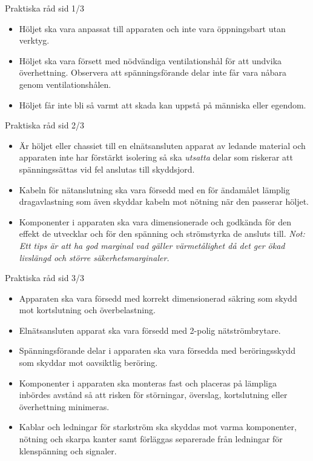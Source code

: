 \documentclass{beamer}
\begin{document}
\begin{frame}{Praktiska råd sid 1/3}
\begin{itemize}
	\item Höljet ska vara anpassat till apparaten och inte vara öppningsbart
	utan verktyg.
	
	\item Höljet ska vara försett med nödvändiga ventilationshål för att
	undvika överhettning.
	Observera att spänningsförande delar inte får vara nåbara genom
	ventilationshålen.
	
	\item Höljet får inte bli så varmt att skada kan uppstå på människa
	eller egendom.
\end{itemize}	
\end{frame}

\begin{frame}{Praktiska råd sid 2/3}
\begin{itemize}
		\item Är höljet eller chassiet till en elnätsansluten apparat av ledande
	material och apparaten inte har förstärkt isolering så ska \emph{utsatta}
	delar som riskerar att spänningssättas vid fel anslutas till skyddsjord.
	
	\item Kabeln för nätanslutning ska vara försedd med en för ändamålet lämplig
	dragavlastning som även skyddar kabeln mot nötning när den passerar höljet.
	
	\item Komponenter i apparaten ska vara dimensionerade och godkända
	för den effekt de utvecklar och för den spänning och strömstyrka de
	ansluts till.
	\emph{Not: Ett tips är att ha god marginal vad gäller värmetålighet då det
		ger ökad livslängd och större säkerhetsmarginaler.}
\end{itemize}
\end{frame}

\begin{frame}{Praktiska råd sid 3/3}
\begin{itemize}
\item Apparaten ska vara försedd med korrekt dimensionerad säkring
som skydd mot kortslutning och överbelastning.

\item Elnätsansluten apparat ska vara försedd med 2-polig nätströmbrytare.

\item Spänningsförande delar i apparaten ska vara försedda med
beröringsskydd som skyddar mot oavsiktlig beröring.

\item Komponenter i apparaten ska monteras fast och placeras på lämpliga
inbördes avstånd så att risken för störningar, överslag, kortslutning eller
överhettning minimeras.

\item Kablar och ledningar för starkström ska skyddas mot varma komponenter,
nötning och skarpa kanter samt förläggas separerade från ledningar för
klenspänning och signaler.
\end{itemize}
\end{frame}
\end{document}
